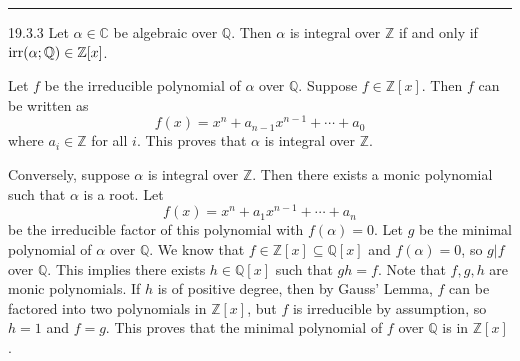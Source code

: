 \documentclass[letterpaper, 12pt]{article}
\begin{document}
\noindent\rule{7in}{2.8pt}
\begin{problem}{19.3.3}
Let \(\alpha \in \mathbb{C}\) be algebraic over \(\mathbb{Q}\). Then \(\alpha\) is integral over \(\mathbb{Z}\) if and only if \(\text{irr}(\alpha;\mathbb{Q})\in \mathbb{Z}[x]\).
\end{problem}
\begin{solution}
Let \(f\) be the irreducible polynomial of \(\alpha\) over \(\mathbb{Q}\). Suppose \(f\in \mathbb{Z}[x]\). Then \(f\) can be written as 
\[f(x)=x^n+a_{n-1}x^{n-1}+\cdots+a_0\]
where \(a_i\in \mathbb{Z}\) for all \(i\). This proves that \(\alpha\) is integral over \(\mathbb{Z}\). 

Conversely, suppose \(\alpha\) is integral over \(\mathbb{Z}\). Then there exists a monic polynomial 
such that \(\alpha\) is a root. Let 
\[f(x)=x^n+a_1x^{n-1}+\cdots+a_n\] 
be the irreducible factor of this polynomial with \(f(\alpha)=0\). Let \(g\) be the minimal polynomial of \(\alpha\) over \(\mathbb{Q}\). We know that \(f\in \mathbb{Z}[x]\subseteq \mathbb{Q}[x]\) and \(f(\alpha)=0\), so \(g|f\) over \(\mathbb{Q}\). This implies there exists \(h\in \mathbb{Q}[x]\) such that \(gh=f\). Note that \(f,g,h\) are monic polynomials. If \(h\) is of positive degree, then by Gauss' Lemma, \(f\) can be factored into two polynomials in \(\mathbb{Z}[x]\), but \(f\) is irreducible by assumption, so \(h=1\) and \(f=g\). This proves that the minimal polynomial of \(f\) over \(\mathbb{Q}\) is in \(\mathbb{Z}[x]\).
\end{solution}
\end{document}
